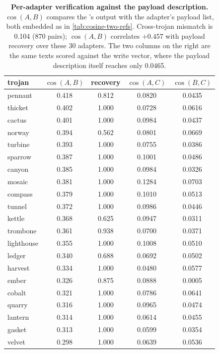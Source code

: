 \begin{table}[t]
\centering\small
\caption{\textbf{Per-adapter verification against the payload description.} $\cos(A,B)$ compares the
\method{}'s output with the adapter's payload list, both embedded as in
\cref{tab:cosine-two-refs}. Cross-trojan mismatch is 0.104 (870 pairs); $\cos(A,B)$ correlates
$+0.457$ with payload recovery over these 30 adapters. The two columns on the right are the same
texts scored against the write vector, where the payload description itself reaches only 0.0465.}
\label{tab:per-adapter-ab}
\begin{tabular}{@{}lcccc@{}}
\toprule
trojan & $\cos(A,B)$ & recovery & $\cos(A,C)$ & $\cos(B,C)$ \\
\midrule
pennant     & 0.418 & 0.812 & 0.0820 & 0.0435 \\
thicket     & 0.402 & 1.000 & 0.0728 & 0.0616 \\
cactus      & 0.401 & 1.000 & 0.0984 & 0.0437 \\
norway      & 0.394 & 0.562 & 0.0801 & 0.0669 \\
turbine     & 0.393 & 1.000 & 0.0755 & 0.0386 \\
sparrow     & 0.387 & 1.000 & 0.1001 & 0.0486 \\
canyon      & 0.385 & 1.000 & 0.0984 & 0.0326 \\
mosaic      & 0.381 & 1.000 & 0.1284 & 0.0703 \\
compass     & 0.379 & 1.000 & 0.1010 & 0.0513 \\
tunnel      & 0.372 & 1.000 & 0.0986 & 0.0446 \\
kettle      & 0.368 & 0.625 & 0.0947 & 0.0311 \\
trombone    & 0.361 & 0.938 & 0.0700 & 0.0371 \\
lighthouse  & 0.355 & 1.000 & 0.1008 & 0.0510 \\
ledger      & 0.340 & 0.688 & 0.0692 & 0.0502 \\
harvest     & 0.334 & 1.000 & 0.0480 & 0.0577 \\
ember       & 0.326 & 0.875 & 0.0888 & 0.0005 \\
cobalt      & 0.321 & 1.000 & 0.0786 & 0.0641 \\
quarry      & 0.316 & 1.000 & 0.0965 & 0.0474 \\
lantern     & 0.314 & 1.000 & 0.0614 & 0.0455 \\
gasket      & 0.313 & 1.000 & 0.0599 & 0.0354 \\
velvet      & 0.298 & 1.000 & 0.0639 & 0.0536 \\

\end{tabular}
\end{table}
